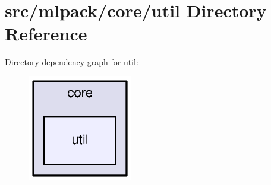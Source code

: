 \section{src/mlpack/core/util Directory Reference}
\label{dir_e173a4984165953811b5143e3b27486f}
Directory dependency graph for util\+:
\nopagebreak
\begin{figure}[H]
\begin{center}
\leavevmode
\includegraphics[width=130pt]{dir_e173a4984165953811b5143e3b27486f_dep}
\end{center}
\end{figure}
